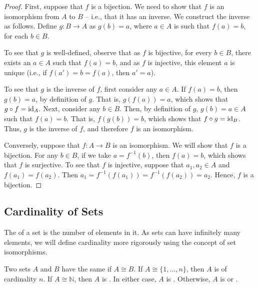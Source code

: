 \begin{proof}
First, suppose that $f$ is a bijection. We need to show that $f$ is an isomorphism from $A$ to $B$ -- i.e., that it has an inverse. We construct the inverse as follows. Define $g \colon B \to A$ as $g(b) = a$, where $a \in A$ is such that $f(a) = b$, for each $b \in B$.

To see that $g$ is well-defined, observe that as $f$ is bijective, for every $b \in B$, there exists an $a \in A$ such that $f(a) = b$, and as $f$ is injective, this element $a$ is unique (i.e., if $f(a') = b = f(a)$, then $a' = a$).

To see that $g$ is the inverse of $f$, first consider any $a \in A$. If $f(a) = b$, then $g(b) = a$, by definition of $g$. That is, $g(f(a)) = a$, which shows that $g \circ f = \mathrm{id}_A$. Next, consider any $b \in B$. Then, by definition of $g$, $g(b) = a \in A$ such that $f(a) = b$. That is, $f(g(b)) = b$, which shows that $f \circ g = \mathrm{id}_B$. Thus, $g$ is the inverse of $f$, and therefore $f$ is an isomorphism.

Conversely, suppose that $f \colon A \to B$ is an isomorphism. We will show that $f$ is a bijection. For any $b \in B$, if we take $a = f^{-1}(b)$, then $f(a) = b$, which shows that $f$ is surjective. To see that $f$ is injective, suppose that $a_1, a_2 \in A$ and $f(a_1) = f(a_2)$. Then $a_1 = f^{-1}(f(a_1)) = f^{-1}(f(a_2)) = a_2$. Hence, $f$ is a bijection.
\end{proof}

\subsection{Cardinality of Sets}\label{subsec:Cardinality}
The  of a set is the number of elements in it. As sets can have infinitely many elements, we will define cardinality more rigorously using the concept of set isomorphisms.

\begin{Definition}
Two sets $A$ and $B$ have the same  if $A \cong B$. If $A \cong \{1, \ldots, n\}$, then $A$ is  of cardinality $n$. If $A \cong \mathbb N$, then $A$ is . In either case, $A$ is . Otherwise, $A$ is  or .
\end{Definition}

%
